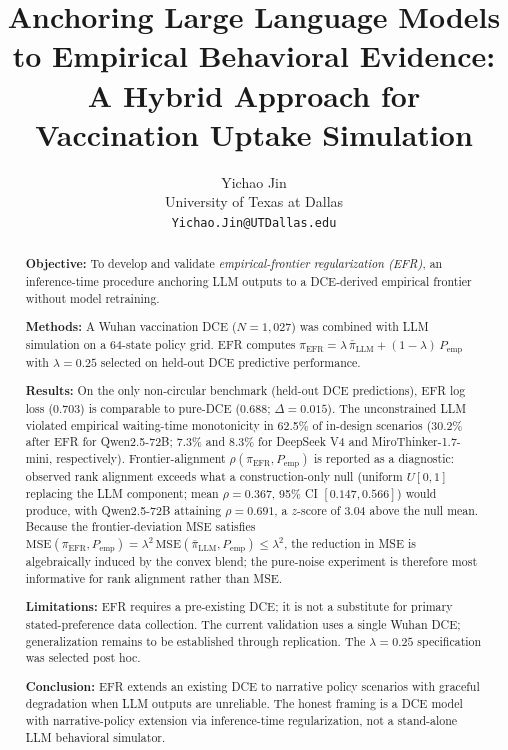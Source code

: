 \documentclass[11pt]{article}
\title{Anchoring Large Language Models to Empirical Behavioral Evidence: A Hybrid Approach for Vaccination Uptake Simulation}
\author{Yichao Jin \\ University of Texas at Dallas \\ \texttt{Yichao.Jin@UTDallas.edu}}
\date{}
\begin{document}
\maketitle


\begin{abstract}
\textbf{Objective:} To develop and validate \emph{empirical-frontier regularization (EFR)}, an inference-time procedure anchoring LLM outputs to a DCE-derived empirical frontier without model retraining.

\textbf{Methods:} A Wuhan vaccination DCE ($N=1{,}027$) was combined with LLM simulation on a 64-state policy grid. EFR computes $\pi_{\text{EFR}} = \lambda\,\bar{\pi}_{\text{LLM}} + (1-\lambda)\,P_{\text{emp}}$ with $\lambda = 0.25$ selected on held-out DCE predictive performance.

\textbf{Results:} On the only non-circular benchmark (held-out DCE predictions), EFR log loss (0.703) is comparable to pure-DCE (0.688; $\Delta = 0.015$). The unconstrained LLM violated empirical waiting-time monotonicity in 62.5\% of in-design scenarios (30.2\% after EFR for Qwen2.5-72B; 7.3\% and 8.3\% for DeepSeek V4 and MiroThinker-1.7-mini, respectively). Frontier-alignment $\rho(\pi_{\text{EFR}}, P_{\text{emp}})$ is reported as a diagnostic: observed rank alignment exceeds what a construction-only null (uniform $U[0,1]$ replacing the LLM component; mean $\rho = 0.367$, 95\% CI $[0.147, 0.566]$) would produce, with Qwen2.5-72B attaining $\rho = 0.691$, a $z$-score of $3.04$ above the null mean. Because the frontier-deviation MSE satisfies $\mathrm{MSE}(\pi_{\text{EFR}}, P_{\text{emp}}) = \lambda^2\,\mathrm{MSE}(\bar\pi_{\text{LLM}}, P_{\text{emp}}) \le \lambda^2$, the reduction in MSE is algebraically induced by the convex blend; the pure-noise experiment is therefore most informative for rank alignment rather than MSE.

\textbf{Limitations:} EFR requires a pre-existing DCE; it is not a substitute for primary stated-preference data collection. The current validation uses a single Wuhan DCE; generalization remains to be established through replication. The $\lambda = 0.25$ specification was selected post hoc.

\textbf{Conclusion:} EFR extends an existing DCE to narrative policy scenarios with graceful degradation when LLM outputs are unreliable. The honest framing is a DCE model with narrative-policy extension via inference-time regularization, not a stand-alone LLM behavioral simulator.
\end{abstract}
\end{document}
